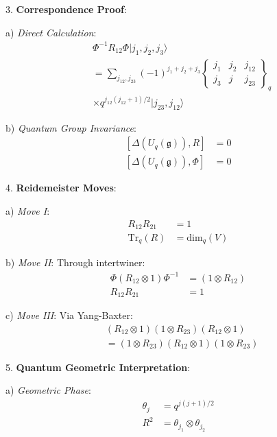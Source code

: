 \documentclass[12pt,a4paper]{article}
\begin{document}
3. \textbf{Correspondence Proof}:
   
   a) \textit{Direct Calculation}:
      \[
      \begin{aligned}
      &\Phi^{-1}R_{12}\Phi|j_1,j_2,j_3\rangle \\
      &= \sum_{j_{12},j_{23}} (-1)^{j_1+j_2+j_3}
      \begin{Bmatrix}
      j_1 & j_2 & j_{12} \\
      j_3 & j & j_{23}
      \end{Bmatrix}_q \\
      &\times q^{j_{12}(j_{12}+1)/2}|j_{23},j_{12}\rangle
      \end{aligned}
      \]
   
   b) \textit{Quantum Group Invariance}:
      \[
      \begin{aligned}
      [\Delta(U_q(\mathfrak{g})), R] &= 0 \\
      [\Delta(U_q(\mathfrak{g})), \Phi] &= 0
      \end{aligned}
      \]

4. \textbf{Reidemeister Moves}:
   
   a) \textit{Move I}:
      \[
      \begin{aligned}
      R_{12}R_{21} &= 1 \\
      \text{Tr}_q(R) &= \text{dim}_q(V)
      \end{aligned}
      \]
   
   b) \textit{Move II}:
      Through intertwiner:
      \[
      \begin{aligned}
      \Phi(R_{12} \otimes 1)\Phi^{-1} &= (1 \otimes R_{12}) \\
      R_{12}R_{21} &= 1
      \end{aligned}
      \]
   
   c) \textit{Move III}:
      Via Yang-Baxter:
      \[
      \begin{aligned}
      &(R_{12} \otimes 1)(1 \otimes R_{23})(R_{12} \otimes 1) \\
      &= (1 \otimes R_{23})(R_{12} \otimes 1)(1 \otimes R_{23})
      \end{aligned}
      \]

5. \textbf{Quantum Geometric Interpretation}:
   
   a) \textit{Geometric Phase}:
      \[
      \begin{aligned}
      \theta_j &= q^{j(j+1)/2} \\
      R^2 &= \theta_{j_1} \otimes \theta_{j_2}
      \end{aligned}
      \]
   
\end{document}

